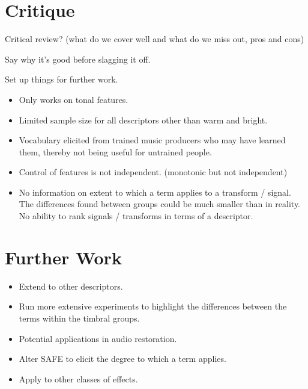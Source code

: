 \section{Critique}
\label{sec:Conclusion-Critique}
	\note
	{
		Critical review? (what do we cover well and what do we miss out, pros and cons)

		Say why it's good before slagging it off.

		Set up things for further work.

		\begin{itemize}
			\item Only works on tonal features.
			\item Limited sample size for all descriptors other than warm and bright.
			\item Vocabulary elicited from trained music producers who may have learned them, thereby not being
				useful for untrained people.
			\item Control of features is not independent. (monotonic but not independent)
			\item No information on extent to which a term applies to a transform / signal. The differences
				found between groups could be much smaller than in reality. No ability to rank signals /
				transforms in terms of a descriptor.
		\end{itemize}
	}

\section{Further Work}
\label{sec:Conclusion-FurtherWork}
	\note
	{
		\begin{itemize}
			\item Extend to other descriptors.
			\item Run more extensive experiments to highlight the differences between the terms within the
				timbral groups.
			\item Potential applications in audio restoration.
			\item Alter SAFE to elicit the degree to which a term applies.
			\item Apply to other classes of effects.
		\end{itemize}
	}
